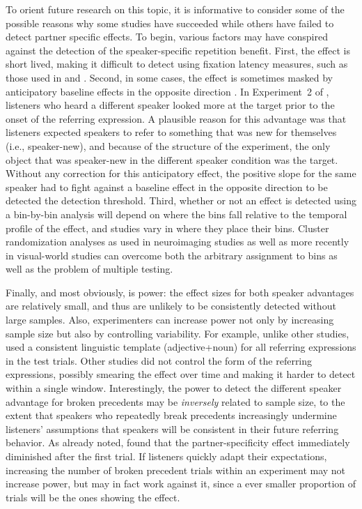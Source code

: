 \documentclass[doc,fignum,apacite,floatsintext]{apa6}
\begin{document}
To orient future research on this topic, it is informative to consider some of the possible reasons why some studies have succeeded while others have failed to detect partner specific effects.  To begin, various factors may have conspired against the detection of the speaker-specific repetition benefit.  First, the effect is short lived, making it difficult to detect using fixation latency measures, such as those used in  and .  Second, in some cases, the effect is sometimes masked by anticipatory baseline effects in the opposite direction \cite{barr08a}.  In Experiment~2 of , listeners who heard a different speaker looked more at the target prior to the onset of the referring expression.  A plausible reason for this advantage was that listeners expected speakers to refer to something that was new for themselves (i.e., speaker-new), and because of the structure of the experiment, the only object that was speaker-new in the different speaker condition was the target.  Without any correction for this anticipatory effect, the positive slope for the same speaker had to fight against a baseline effect in the opposite direction to be detected the detection threshold.  Third, whether or not an effect is detected using a bin-by-bin analysis will depend on where the bins fall relative to the temporal profile of the effect, and studies vary in where they place their bins.  Cluster randomization analyses as used in neuroimaging studies \cite{bullmoreetal99,marisoostenveld07} as well as more recently in visual-world studies \cite{BarrJacksonPhillips2014} can overcome both the arbitrary assignment to bins as well as the problem of multiple testing.

Finally, and most obviously, is power: the effect sizes for both speaker advantages are relatively small, and thus are unlikely to be consistently detected without large samples.  Also, experimenters can increase power not only by increasing sample size but also by controlling variability.  For example, unlike other studies,  used a consistent linguistic template (adjective+noun) for all referring expressions in the test trials.  Other studies did not control the form of the referring expressions, possibly smearing the effect over time and making it harder to detect within a single window.  Interestingly, the power to detect the different speaker advantage for broken precedents may be \textit{inversely} related to sample size, to the extent that speakers who repeatedly break precedents increasingly undermine listeners' assumptions that speakers will be consistent in their future referring behavior.  As already noted,  found that the partner-specificity effect immediately diminished after the first trial.  If listeners quickly adapt their expectations, increasing the number of broken precedent trials within an experiment may not increase power, but may in fact work against it, since a ever smaller proportion of trials will be the ones showing the effect.
\end{document}
